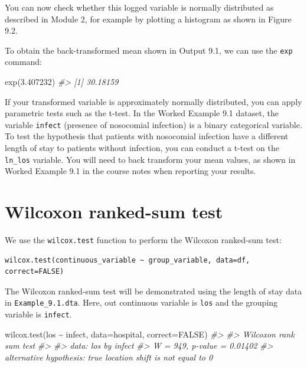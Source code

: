 \documentclass[
]{memoir}
\newenvironment{Shaded}{\begin{snugshade}}{\end{snugshade}}
\newcommand{\AttributeTok}[1]{\textcolor[rgb]{0.77,0.63,0.00}{#1}}
\newcommand{\CommentTok}[1]{\textcolor[rgb]{0.56,0.35,0.01}{\textit{#1}}}
\newcommand{\ConstantTok}[1]{\textcolor[rgb]{0.00,0.00,0.00}{#1}}
\newcommand{\FloatTok}[1]{\textcolor[rgb]{0.00,0.00,0.81}{#1}}
\newcommand{\FunctionTok}[1]{\textcolor[rgb]{0.00,0.00,0.00}{#1}}
\newcommand{\NormalTok}[1]{#1}
\newcommand{\SpecialCharTok}[1]{\textcolor[rgb]{0.00,0.00,0.00}{#1}}
\begin{document}
You can now check whether this logged variable is normally distributed as described in Module 2, for example by plotting a histogram as shown in Figure 9.2.

To obtain the back-transformed mean shown in Output 9.1, we can use the \texttt{exp} command:

\begin{Shaded}
\begin{Highlighting}[]
\FunctionTok{exp}\NormalTok{(}\FloatTok{3.407232}\NormalTok{)}
\CommentTok{\#\textgreater{} [1] 30.18159}
\end{Highlighting}
\end{Shaded}

If your transformed variable is approximately normally distributed, you can apply parametric tests such as the t-test. In the Worked Example 9.1 dataset, the variable \texttt{infect} (presence of nosocomial infection) is a binary categorical variable. To test the hypothesis that patients with nosocomial infection have a different length of stay to patients without infection, you can conduct a t-test on the \texttt{ln\_los} variable. You will need to back transform your mean values, as shown in Worked Example 9.1 in the course notes when reporting your results.

\hypertarget{wilcoxon-ranked-sum-test}{%
\section{Wilcoxon ranked-sum test}\label{wilcoxon-ranked-sum-test}}

We use the \texttt{wilcox.test} function to perform the Wilcoxon ranked-sum test:

\begin{verbatim}
wilcox.test(continuous_variable ~ group_variable, data=df, correct=FALSE)
\end{verbatim}

The Wilcoxon ranked-sum test will be demonstrated using the length of stay data in \texttt{Example\_9.1.dta}. Here, out continuous variable is \texttt{los} and the grouping variable is \texttt{infect}.

\begin{Shaded}
\begin{Highlighting}[]
\FunctionTok{wilcox.test}\NormalTok{(los }\SpecialCharTok{\textasciitilde{}}\NormalTok{ infect, }\AttributeTok{data=}\NormalTok{hospital, }\AttributeTok{correct=}\ConstantTok{FALSE}\NormalTok{)}
\CommentTok{\#\textgreater{} }
\CommentTok{\#\textgreater{}  Wilcoxon rank sum test}
\CommentTok{\#\textgreater{} }
\CommentTok{\#\textgreater{} data:  los by infect}
\CommentTok{\#\textgreater{} W = 949, p{-}value = 0.01402}
\CommentTok{\#\textgreater{} alternative hypothesis: true location shift is not equal to 0}
\end{Highlighting}
\end{Shaded}
\end{document}
